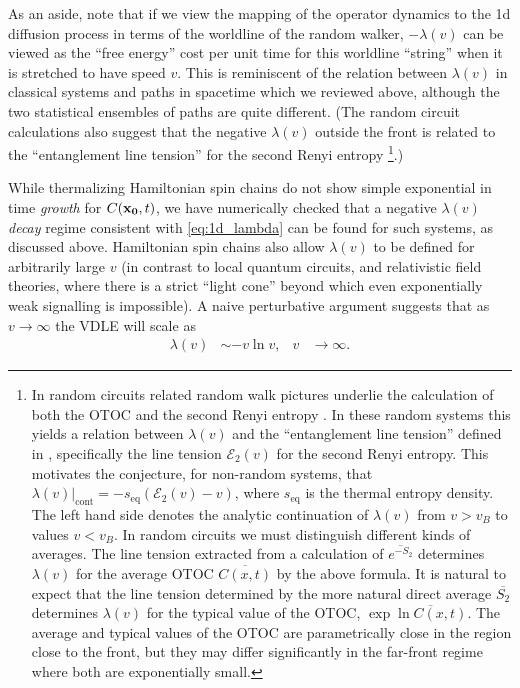 \documentclass[aps,prl,reprint,superscriptaddress, longbibliography]{revtex4-1}
\begin{document}
As an aside, note that if we view the mapping of the operator dynamics to the 1d diffusion process in terms of the worldline of the random walker,  $-\lambda(v)$ can be viewed as the ``free energy'' cost per unit time for this worldline ``string'' when it is stretched to have speed $v$. This is reminiscent of the relation between $\lambda(v)$ in classical systems and paths in spacetime which we reviewed above, although the two statistical ensembles of paths are quite different. (The random circuit calculations also suggest that the negative $\lambda(v)$ outside the front is related to the ``entanglement line tension'' \cite{jonay} for the second Renyi entropy \footnote{{
In random circuits related random walk pictures underlie the calculation of both the OTOC and the second Renyi entropy \cite{opspreadAdam, opspreadCurt}. 
In these random systems this yields a  relation between $\lambda(v)$ and the ``entanglement line tension'' defined in \cite{jonay}, specifically the line tension $\mathcal{E}_2(v)$ for the second Renyi entropy. This motivates the conjecture, for non-random systems, that $\lambda(v)|_\text{cont} = - s_\text{eq} ( \mathcal{E}_2(v) - v)$, where $s_\text{eq}$ is the thermal entropy density. The left hand side denotes the analytic continuation of $\lambda(v)$ from ${v>v_B}$ to values $v<v_B$. In random circuits  we must distinguish different kinds of averages. The line tension extracted from a calculation of $\overline{e^{-S_2}}$ determines $\lambda(v)$ for  the average OTOC $\overline{C(x,t)}$ by the above formula. It is natural to expect that the line tension determined by the more natural direct average  $\overline{S_2}$  determines $\lambda(v)$ for the typical value of the OTOC,  $\exp \overline{\ln C(x,t)}$. The average and typical values of the OTOC are parametrically close in the region close to the front, but they may differ significantly in the far-front regime where both are exponentially small.}}.)


While thermalizing Hamiltonian spin chains do not show simple exponential in time \emph{growth} for $C({\bf x_0},t)$, we have numerically checked that a negative $\lambda(v)$ \emph{decay} regime consistent with \eqref{eq:1d_lambda} can be found for such systems, as discussed above.
Hamiltonian spin chains also allow $\lambda(v)$ to be defined for arbitrarily large $v$ 
 (in contrast to local quantum circuits, and relativistic field theories, where there is a strict ``light cone'' beyond which even exponentially weak signalling is impossible). A naive perturbative argument suggests that as $v\rightarrow \infty$ the VDLE will scale as 
\begin{align}
\lambda(v) &\sim - v \ln v ,
&
v&\rightarrow \infty.
\end{align}
\end{document}

